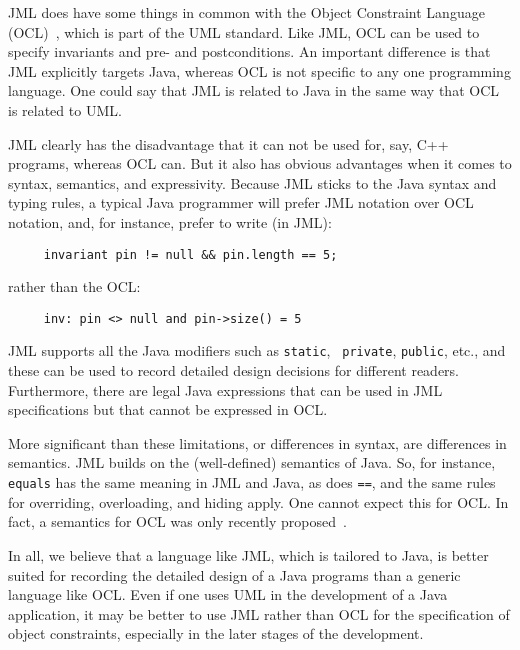 JML does have some things in common with the Object Constraint
Language (OCL)~\cite{WarmerKleppe99}, which is part of the UML
standard.  Like JML, OCL can be used to specify invariants and pre-
and postconditions.  An important difference is that JML explicitly
targets Java, whereas OCL is not specific to any one programming
language.  One could say that JML is related to Java in the same way
that OCL is related to UML\@.

JML clearly has the disadvantage that it can not be used for, say, C++
programs, whereas OCL can.  But it also has obvious advantages when it
comes to syntax, semantics, and expressivity.  Because JML sticks to
the Java syntax and typing rules, a typical Java programmer will
prefer JML notation over OCL notation, and, for instance, prefer to
write (in JML):
\begin{verbatim}
     invariant pin != null && pin.length == 5;
\end{verbatim}
rather than the OCL:
\begin{verbatim}
     inv: pin <> null and pin->size() = 5
\end{verbatim}

JML supports all the Java modifiers such as {\tt static}, {\tt
  private}, {\tt public}, etc., and these can be used to record
detailed design decisions for different readers.
Furthermore, there are legal Java
expressions that can be used in JML specifications but that cannot be
expressed in OCL\@.

More significant than these limitations, or differences in syntax, are
differences in semantics.  JML builds on the (well-defined) semantics
of Java. So, for instance, {\tt equals} has the same meaning in JML
and Java, as does {\tt ==}, and the same rules for overriding,
overloading, and hiding apply.  One cannot expect this for OCL\@.  In
fact, a semantics for OCL was only recently
proposed~\cite{brucker.ea:proposal:2002}.

In all, we believe that a language like JML, which is tailored to
Java, is better suited for recording the detailed design of a Java
programs than a generic language like OCL\@.  Even if one uses UML in
the development of a Java application, it may be better to use JML
rather than OCL for the specification of object constraints,
especially in the later stages of the development.

